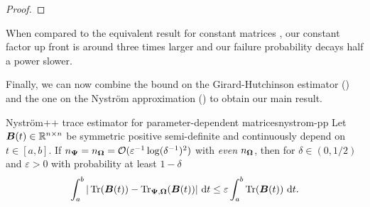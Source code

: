 \begin{proof}
\end{proof}

When compared to the equivalent result for constant matrices \cite[Lemma 3.2]{persson-2022-improved-variants}, our constant factor up front is around three times larger and our failure probability decays half a power slower.

Finally, we can now combine the bound on the Girard-Hutchinson estimator () and the one on the Nyström approximation () to obtain our main result.

\begin{theorem}{Nyström++ trace estimator for parameter-dependent matrices}{nystrom-pp}
    Let $\boldsymbol{B}(t) \in \mathbb{R}^{n \times n}$ be symmetric positive semi-definite and continuously depend on $t \in [a, b]$. If $n_{\boldsymbol{\Psi}} = n_{\boldsymbol{\Omega}} = \mathcal{O}(\varepsilon^{-1} \log(\delta^{-1})^2)$ with \emph{even} $n_{\boldsymbol{\Omega}}$, then for $\delta \in (0, 1/2)$ and $\varepsilon > 0$ with probability at least $1 - \delta$ 
    \begin{equation}
        \int_{a}^{b} | \operatorname{Tr}(\boldsymbol{B}(t)) - \operatorname{Tr}_{\boldsymbol{\Psi}, \boldsymbol{\Omega}}(\boldsymbol{B}(t)) |~\mathrm{d}t
        \leq \varepsilon \int_{a}^{b} \operatorname{Tr}(\boldsymbol{B}(t))~\mathrm{d}t.
    \end{equation}
\end{theorem}


